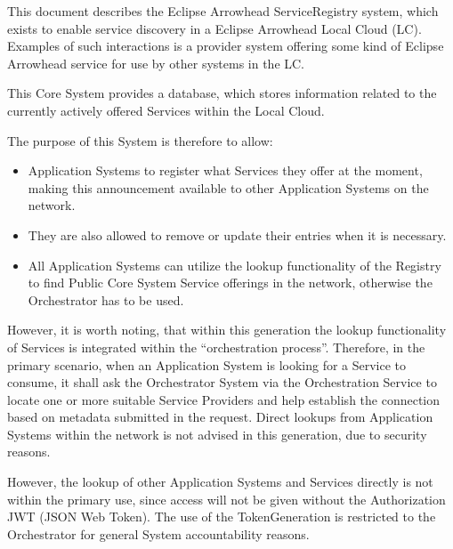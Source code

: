 \documentclass[a4paper]{arrowhead}
\begin{document}
This document describes the Eclipse Arrowhead  ServiceRegistry system,
which exists to enable service discovery in a Eclipse Arrowhead Local Cloud (LC).  Examples of such interactions is a provider system
  offering some kind of Eclipse Arrowhead service for use by other systems in the LC. 

This Core System provides a database, which stores information related to the currently actively offered Services within the Local Cloud.

The purpose of this System is therefore to allow:
\begin{itemize}

\item Application Systems to register what Services they offer at the moment, making this announcement available to other Application Systems on the network.
\item They are also allowed to remove or update their entries when it is necessary.
\item  All Application Systems can utilize the lookup functionality of the Registry to find Public Core System Service offerings in the network, otherwise the Orchestrator has to be used.
\end{itemize}

However, it is worth noting, that within this generation the lookup functionality of Services is integrated within the “orchestration process”. Therefore, in the primary scenario, when an Application System is looking for a Service to consume, it shall ask the Orchestrator System via the Orchestration Service to locate one or more suitable Service Providers and help establish the connection based on metadata submitted in the request. Direct lookups from Application Systems within the network is not advised in this generation, due to security reasons.

However, the lookup of other Application Systems and Services directly is not within the primary use, since access will not be given without the Authorization JWT (JSON Web Token). The use of the TokenGeneration is restricted to the Orchestrator for general System accountability reasons.
\end{document}
